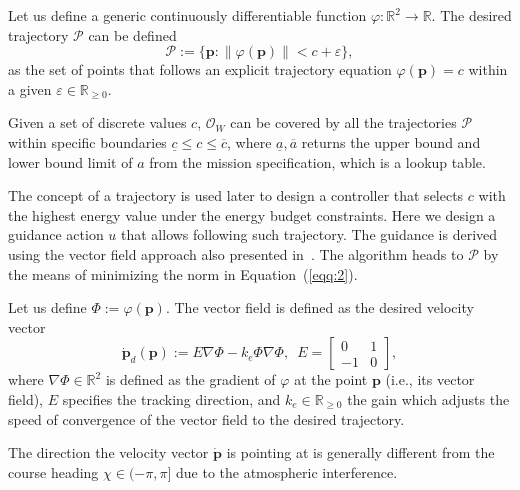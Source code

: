 \documentclass[letterpaper,10pt,conference]{ieeeconf}
\begin{document}
Let us define a generic continuously differentiable function $\varphi:\mathbb{R}^2\rightarrow\mathbb{R}$. The desired trajectory $\mathcal{P}$ can be defined
\begin{equation}\label{eqq:2}
  \mathcal{P}:=\{\mathbf{p}:\|\varphi(\mathbf{p})\|<c+\varepsilon\},
\end{equation}
as the set of points that follows an explicit trajectory equation $\varphi(\mathbf{p})=c$ within a given $\varepsilon\in\mathbb{R}_{\geq 0}$. 

Given a set of discrete values $c$, $\mathcal{O}_W$ can be covered by all the trajectories $\mathcal{P}$ within specific boundaries $\underline{c}\leq c\leq \overline{c}$, where $\underline{a},\overline{a}$ returns the upper bound and lower bound limit of $a$ from the mission specification, which is a lookup table.

The concept of a trajectory is used later to design a controller that selects $c$ with the highest energy value under the energy budget constraints. Here we design a guidance action $u$ that allows following such trajectory. The guidance is derived using the vector field approach also presented in~\cite{de2017guidance}. The algorithm heads to $\mathcal{P}$ by the means of minimizing the norm in Equation~(\ref{eqq:2}).

Let us define $\varPhi:=\varphi(\mathbf{p})$. The vector field is defined as the desired velocity vector
\begin{equation}\label{eqq:3}
  \dot{\mathbf{p}}_d(\mathbf{p}):=E\nabla\varPhi-k_e\varPhi\nabla\varPhi,\,\,\,E=\begin{bmatrix}
    0&1\\-1&0
  \end{bmatrix},
\end{equation}
where $\nabla\varPhi\in\mathbb{R}^2$ is defined as the gradient of $\varphi$ at the point $\mathbf{p}$ (i.e., its vector field), $E$ specifies the tracking direction, and $k_e\in\mathbb{R}_{\geq 0}$ the gain which adjusts the speed of convergence of the vector field to the desired trajectory.

The direction the velocity vector $\dot{\mathbf{p}}$ is pointing at is generally different from the course heading $\chi\in(-\pi,\pi]$ due to the atmospheric interference.
\end{document}
